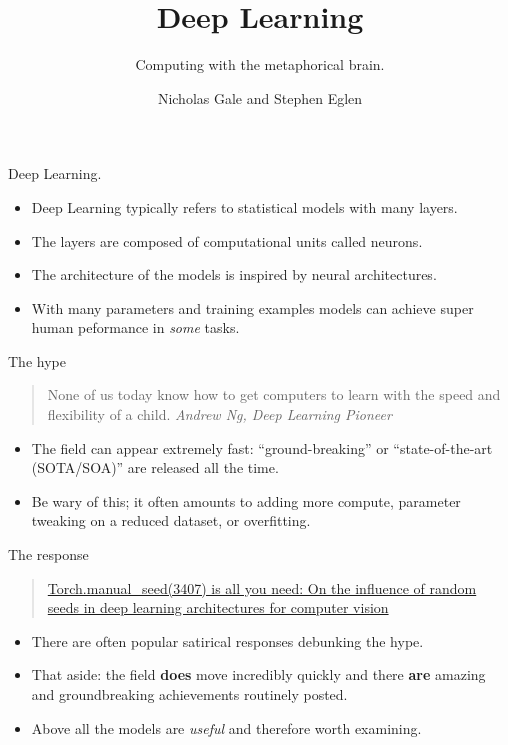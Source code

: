 \documentclass[
  ignorenonframetext,
]{beamer}
\title{Deep Learning}
\subtitle{Computing with the metaphorical brain.}
\author{Nicholas Gale and Stephen Eglen}
\date{}
\begin{document}
\frame{\titlepage}
\ifdefined\Shaded\renewenvironment{Shaded}{\begin{tcolorbox}[frame hidden, boxrule=0pt, enhanced, breakable, sharp corners, borderline west={3pt}{0pt}{shadecolor}, interior hidden]}{\end{tcolorbox}}\fi

\begin{frame}{Deep Learning.}
\protect\hypertarget{deep-learning.}{}
\begin{itemize}
\item
  Deep Learning typically refers to statistical models with many layers.
\item
  The layers are composed of computational units called neurons.
\item
  The architecture of the models is inspired by neural architectures.
\item
  With many parameters and training examples models can achieve super
  human peformance in \emph{some} tasks.
\end{itemize}
\end{frame}

\begin{frame}{The hype}
\protect\hypertarget{the-hype}{}
\begin{quote}
None of us today know how to get computers to learn with the speed and
flexibility of a child. \emph{Andrew Ng, Deep Learning Pioneer}
\end{quote}

\begin{itemize}
\item
  The field can appear extremely fast: ``ground-breaking'' or
  ``state-of-the-art (SOTA/SOA)'' are released all the time.
\item
  Be wary of this; it often amounts to adding more compute, parameter
  tweaking on a reduced dataset, or overfitting.
\end{itemize}
\end{frame}

\begin{frame}{The response}
\protect\hypertarget{the-response}{}
\begin{quote}
\href{https://arxiv.org/abs/2109.08203}{Torch.manual\_seed(3407) is all
you need: On the influence of random seeds in deep learning
architectures for computer vision}
\end{quote}

\begin{itemize}
\item
  There are often popular satirical responses debunking the hype.
\item
  That aside: the field \textbf{does} move incredibly quickly and there
  \textbf{are} amazing and groundbreaking achievements routinely posted.
\item
  Above all the models are \emph{useful} and therefore worth examining.
\end{itemize}
\end{frame}
\end{document}
